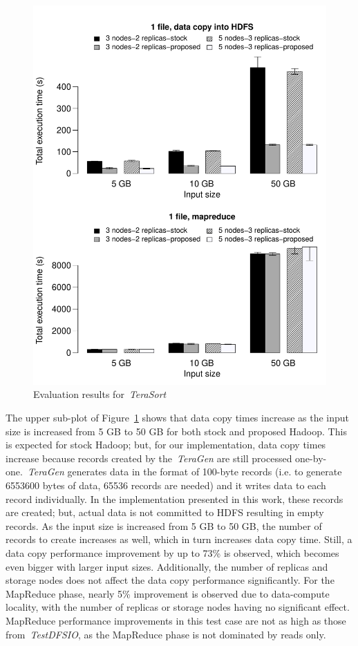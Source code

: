 \documentclass[preprint,12pt]{elsarticle}
\begin{document}
\begin{figure}[!htbp]
\centering
\includegraphics[width=\columnwidth, keepaspectratio]{result4.pdf}
\caption{Evaluation results for~\textit{TeraSort}}
\label{terasortres}
\end{figure}

The upper sub-plot of Figure~\ref{terasortres} shows that data copy times increase as the input
size is increased from 5 GB to 50 GB for both stock and proposed Hadoop. This is expected for stock
Hadoop; but, for our implementation, data copy times increase because records created by
the~\textit{TeraGen} are still processed one-by-one.~\textit{TeraGen} generates data in the format
of 100-byte records (i.e. to generate 6553600 bytes of data, 65536 records are needed) and it writes
data to each record individually. In the implementation presented in this work, these records
are created; but, actual data is not committed to HDFS resulting in empty records. As the input
size is increased from 5 GB to 50 GB, the number of records to create increases as well, which
in turn increases data copy time. Still, a data copy performance improvement by up to 73\% is
observed, which becomes even bigger with larger input sizes. Additionally, the number of replicas
and storage nodes does not affect the data copy performance significantly. For the MapReduce phase,
nearly 5\% improvement is observed due to data-compute locality, with the number of replicas or
storage nodes having no significant effect. MapReduce performance improvements in this
test case are not as high as those from~\textit{TestDFSIO}, as the MapReduce phase is not dominated by reads
only.
\end{document}
